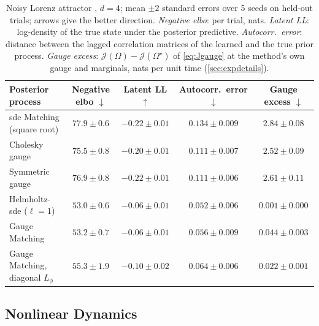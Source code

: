 \documentclass{article} %
\newcommand{\gauge}{\Omega}
\begin{document}
\begin{table}[t]
    \centering
    \caption{Noisy Lorenz attractor \citep{smith2026closing}, $d = 4$; mean $\pm 2$ standard errors over 5 seeds on held-out trials; arrows give the better direction. \emph{Negative \gls{elbo}}: per trial, nats. \emph{Latent LL}: log-density of the true state under the posterior predictive. \emph{Autocorr.\ error}: distance between the lagged correlation matrices of the learned and the true prior process. \emph{Gauge excess}: $\mathcal{J}(\gauge) - \mathcal{J}(\gauge^\star)$ of \cref{eq:Jgauge} at the method's own gauge and marginals, nats per unit time (\cref{sec:expdetails}).}
    \label{tab:lorenz}
    \small
    \setlength{\tabcolsep}{5pt}
    \begin{tabular}{lcccc}
        \toprule
        Posterior process & Negative \gls{elbo} $\downarrow$ & Latent LL $\uparrow$ & Autocorr.\ error $\downarrow$ & Gauge excess $\downarrow$ \\
        \midrule
        \gls{sde} Matching (square root) & $77.9 \pm 0.6$ & $-0.22 \pm 0.01$ & $0.134 \pm 0.009$ & $2.84 \pm 0.08$ \\
        Cholesky gauge & $75.5 \pm 0.8$ & $-0.20 \pm 0.01$ & $0.111 \pm 0.007$ & $2.52 \pm 0.09$ \\
        Symmetric gauge & $76.9 \pm 0.8$ & $-0.22 \pm 0.01$ & $0.111 \pm 0.006$ & $2.61 \pm 0.11$ \\
        Helmholtz-\gls{sde} ($\ell = 1$) & $53.0 \pm 0.6$ & $-0.06 \pm 0.01$ & $0.052 \pm 0.006$ & $0.001 \pm 0.000$ \\
        Gauge Matching & $53.2 \pm 0.7$ & $-0.06 \pm 0.01$ & $0.056 \pm 0.009$ & $0.044 \pm 0.003$ \\
        \midrule
        Gauge Matching, diagonal $L_\phi$ & $55.3 \pm 1.9$ & $-0.10 \pm 0.02$ & $0.064 \pm 0.006$ & $0.022 \pm 0.001$ \\
        \bottomrule
    \end{tabular}
\end{table}

\subsection{Nonlinear Dynamics}
\label{sec:exp:nonlinear}
\end{document}
